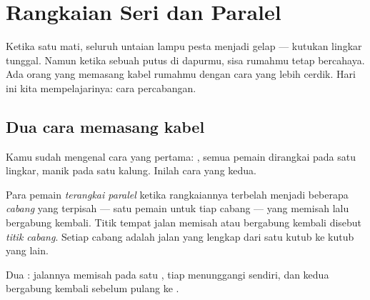 \chapter{Rangkaian Seri dan Paralel}\label{ch:g5:series-parallel-circuits}

Ketika satu  mati, seluruh untaian lampu pesta menjadi gelap ---
kutukan lingkar tunggal. Namun ketika sebuah  putus di dapurmu,
sisa rumahmu tetap bercahaya. Ada orang yang memasang kabel rumahmu
dengan cara yang lebih cerdik. Hari ini kita mempelajarinya: cara
percabangan.

\section{Dua cara memasang kabel}

Kamu sudah mengenal cara yang pertama: \emph{}, semua
pemain dirangkai pada satu lingkar, manik pada satu kalung. Inilah
cara yang kedua.

\begin{definition}\label{def:g5:series-parallel-circuits:parallel}
Para pemain \emph{terangkai paralel} ketika
rangkaiannya terbelah menjadi beberapa \emph{cabang}
yang terpisah --- satu pemain untuk tiap cabang --- yang memisah lalu
bergabung kembali. Titik tempat jalan memisah atau bergabung kembali
disebut \emph{titik cabang}. Setiap cabang adalah
jalan yang lengkap dari satu kutub  ke kutub yang lain.
\end{definition}

\begin{omfigure}

{\small Dua  : jalannya memisah pada satu , tiap  menunggangi  sendiri, dan kedua 
bergabung kembali sebelum pulang ke .}
\end{omfigure}

